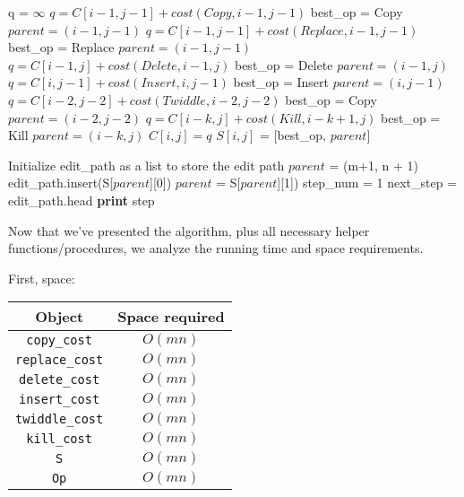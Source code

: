 \documentclass[paper=a4, fontsize=11pt]{scrartcl} %
\numberwithin{equation}{section} %
\numberwithin{figure}{section} %
\numberwithin{table}{section} %
\begin{document}
\begin{algorithmic}
\State q = $\infty$
	\State $q = C[i - 1, j - 1] + cost(Copy, i - 1, j - 1)$
	\State best\_op = Copy
	\State $parent = (i - 1, j - 1)$
\EndIf
{}
	\State $q = C[i - 1, j - 1] + cost(Replace, i - 1, j - 1)$
	\State best\_op = Replace	
	\State $parent = (i - 1, j - 1)$
\EndIf
{}
	\State $q = C[i - 1, j] + cost(Delete, i -1, j)$
	\State best\_op = Delete	
	\State $parent = (i - 1, j)$
\EndIf
{}
	\State $q = C[i, j - 1] + cost(Insert, i, j - 1)$
	\State best\_op = Insert	
	\State $parent = (i, j - 1)$
\EndIf
{}
	\State $q = C[i - 2, j - 2] + cost(Twiddle, i - 2, j - 2)$
	\State best\_op = Copy	
	\State $parent = (i - 2, j - 2)$
\EndIf
{}
			\State $q = C[i - k, j] + cost(Kill, i - k + 1, j)$
			\State best\_op = Kill	
			\State $parent = (i - k, j)$
		\EndIf
	\EndFor
\EndIf
\State $C[i, j] = q$
\State $S[i, j]$ = [best\_op, $parent$] 
\EndFunction
\end{algorithmic}

\begin{algorithmic}
\State Initialize edit\_path as a list to store the edit path
\State $parent$ = (m+1, n + 1)
	\State edit\_path.insert(S[$parent$][0]) 
	\State $parent$ = S[$parent$][1]) 
\EndWhile
\State step\_num = 1
\State next\_step = edit\_path.head
	\State \textbf{print} step
\EndFor
\EndFunction
\end{algorithmic}

Now that we've presented the algorithm, plus all necessary helper functions/procedures, we analyze the running time and space requirements.

First, space:

\begin{center}
\begin{tabular}{ | c | c | }
\hline
\textbf{Object} & \textbf{Space required} \\
\hline
\texttt{copy\_cost} & $O(mn)$ \\
\hline
\texttt{replace\_cost} & $O(mn)$ \\
\hline
\texttt{delete\_cost} & $O(mn)$ \\
\hline
\texttt{insert\_cost} & $O(mn)$ \\
\hline
\texttt{twiddle\_cost} & $O(mn)$ \\
\hline
\texttt{kill\_cost} & $O(mn)$ \\
\hline
\texttt{S} & $O(mn)$ \\
\hline
\texttt{Op} & $O(mn)$ \\
\hline
\end{tabular}
\end{center}
\end{document}
